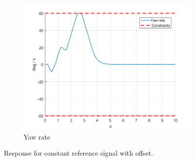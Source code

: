 \documentclass[11pt]{article}
\begin{document}
\begin{enumerate}
\begin{figure}[ht]
\begin{subfigure}[c]{0.3\linewidth}
            \includegraphics[width=\linewidth]{Plots_05_ReferenceTracking_Constant/06}
            \caption{Yaw rate}
        \end{subfigure}
        \caption{Response for constant reference signal with offset.}
        \label{fig:constant_reference_with_offset}
    \end{figure}


\end{enumerate}
\end{document}
